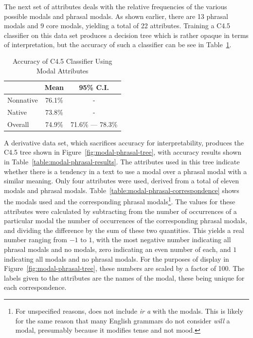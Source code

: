 \documentclass[main.tex]{subfiles}
\begin{document}
The next set of attributes deals with the relative frequencies of the various possible modals and phrasal modals. As shown earlier, there are 13 phrasal modals and 9 core modals, yielding a total of 22 attributes. Training a C4.5 classifier on this data set produces a decision tree which is rather opaque in terms of interpretation, but the accuracy of such a classifier can be see in Table~\ref{table:modal-attributes-results}. 
\begin{table}[htbp]
\centering
\caption{Accuracy of C4.5 Classifier Using Modal Attributes}
\begin{tabular}{l c c}
\toprule
& Mean & 95\% C.I.\\
\midrule
Nonnative & 76.1\% & - \\
[6pt]Native & 73.8\% & - \\
[6pt]Overall & 74.9\% & 71.6\% --- 78.3\% \\
\bottomrule
\end{tabular}
\label{table:modal-attributes-results}
\end{table}
A derivative data set, which sacrifices accuracy for interpretability, produces the C4.5 tree shown in Figure~\ref{fig:modal-phrasal-tree}, with accuracy results shown in Table~\ref{table:modal-phrasal-results}. The attributes used in this tree indicate whether there is a tendency in a text to use a modal over a phrasal modal with a similar meaning. Only four attributes were used, derived from a total of eleven modals and phrasal modals. Table~\ref{table:modal-phrasal-correspondence} shows the modals used and the corresponding phrasal modals\footnote{For unspecified reasons, \citet{butt} does not include \textit{ir a} with the modals. This is likely for the same reason that many English grammars do not consider \textit{will} a modal, presumably because it modifies tense and not mood.}. The values for these attributes were calculated by subtracting from the number of occurrences of a particular modal the number of occurrences of the corresponding phrasal modals, and dividing the difference by the sum of these two quantities. This yields a real number ranging from $-1$ to $1$, with the most negative number indicating all phrasal modals and no modals, zero indicating an even number of each, and $1$ indicating all modals and no phrasal modals. For the purposes of display in Figure~\ref{fig:modal-phrasal-tree}, these numbers are scaled by a factor of 100. The labels given to the attributes are the names of the modal, these being unique for each correspondence.
\end{document}
